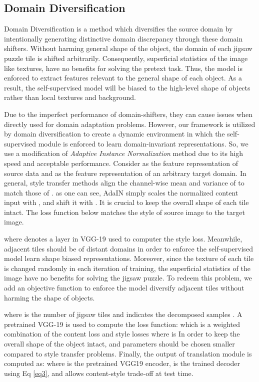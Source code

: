 \documentclass[10pt,twocolumn,letterpaper]{article}
\begin{document}
\subsection{Domain Diversification}
Domain Diversification is a method which diversifies the source domain by intentionally generating distinctive domain discrepancy through these domain shifters.
Without harming general shape of the object, the domain of each jigsaw puzzle tile is shifted arbitrarily.
Consequently, superficial statistics of the image like textures, have no benefits for solving the pretext task. Thus, the model is enforced to extract features relevant to the general shape of each object. As a result, the self-supervised model will be biased to the high-level shape of objects rather than local textures and background.

Due to the imperfect performance of domain-shifters, they can cause issues when directly used for domain adaptation problems. However, our framework is utilized by domain diversification to create a dynamic environment in which the self-supervised module is enforced to learn domain-invariant representations. So, we use a modification of \textit{Adaptive Instance Normalization} method due to its high speed and acceptable performance.
Consider  as the feature representation of source data and  as the feature representation of an arbitrary target domain. In general, style transfer methods align the channel-wise mean and variance of  to match those of .
\label{eq3}
as one can see, AdaIN simply scales the normalized content input with , and shift it with . It is crucial to keep the overall shape of each tile intact. The loss function below matches the style of source image to the target image.

where  denotes a layer in VGG-19 used to computer the style loss. Meanwhile, adjacent tiles should be of distant domains in order to enforce the self-supervised model learn shape biased representations.
Moreover, since the texture of each tile is changed randomly in each iteration of training, the superficial statistics of the image have no benefits for solving the jigsaw puzzle. To redeem this problem, we add an objective function to enforce the model diversify adjacent tiles without harming the shape of objects.

where  is the number of jigsaw tiles and  indicates the decomposed samples . A pretrained VGG-19 is used to compute the loss function:
\label{eq5}
which is a weighted combination of the content loss and style losses where  is
\label{eq6}
In order to keep the overall shape of the object intact,  and  parameters should be chosen smaller compared to style transfer problems.
Finally, the output of translation module is computed as:
\label{eq7}
where  is the pretrained VGG19 encoder,  is the trained decoder using Eq \ref{eq3}, and  allows content-style trade-off at test time.
\end{document}
